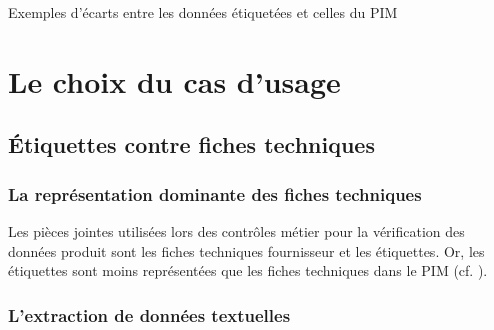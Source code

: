            {\renewcommand{\arraystretch}{1.5}%
            \begin{table}[htbp]
                \begin{center}
                {\scriptsize
                
                }
                \caption{Exemples d'écarts entre les données étiquetées et celles du PIM}
                \label{tbl:ingredient_comparison}
                \end{center}
            \end{table}
            }

    \chapter{Le choix du cas d'usage}

        \section{\'{E}tiquettes contre fiches techniques}

            \subsection{La représentation dominante des fiches techniques}
            
            Les pièces jointes utilisées lors des contrôles métier pour la vérification des données produit sont les fiches techniques fournisseur et les étiquettes.
            Or, les étiquettes sont moins représentées que les fiches techniques dans le PIM (cf. ).
            
            \subsection{L'extraction de données textuelles}

